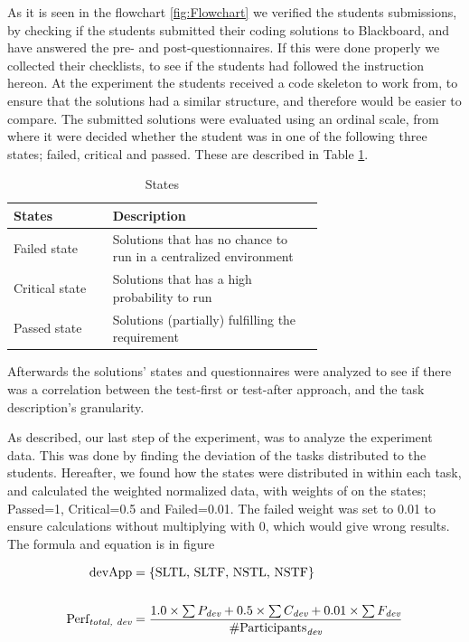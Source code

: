 \documentclass{sig-alternate-05-2015}
\begin{document}
As it is seen in the flowchart \ref{fig:Flowchart} we verified the students submissions, by checking if the students submitted their coding solutions to Blackboard, and have answered the pre- and post-questionnaires. If this were done properly we collected their checklists, to see if the students had followed the instruction hereon.
At the experiment the students received a code skeleton to work from, to ensure that the solutions had a similar structure, and therefore would be easier to compare. The submitted solutions were evaluated using an ordinal scale, from where it were decided whether the student was in one of the following three states; failed, critical and passed. These are described in Table \ref{StatesTable}.

\begin{table}[!ht]
\centering
\caption{States}
\label{StatesTable}
\begin{tabular}{|l|p{0.68\linewidth}|}
\hline
\textbf{States} & \textbf{Description} \\
\hline
\hline
Failed state & Solutions that has no chance to run in a centralized environment \\
Critical state & Solutions that has a high probability to run \\
Passed state & Solutions (partially) fulfilling the requirement \\
\hline
\end{tabular}
\end{table}

Afterwards the solutions' states and questionnaires were analyzed to see if there was a correlation between the test-first or test-after approach, and the task description's granularity.

As described, our last step of the experiment, was to analyze the experiment data. This was done by finding the deviation of the tasks distributed to the students. Hereafter, we found how the states were distributed in within each task, and calculated the weighted normalized data, with weights of on the states; Passed=1, Critical=0.5 and Failed=0.01. The failed weight was set to 0.01 to ensure calculations without multiplying with 0, which would give wrong results.
The formula and equation is in figure

\begin{equation} \label{eq1}
\begin{split}
\text{devApp} &= \{\text{SLTL, SLTF, NSTL, NSTF}\} \\
& \\
\text{Perf}_{\emph{total, dev}} &= \dfrac{1.0\times \sum{P_{\emph{dev}}}+0.5\times \sum {C_{\emph{dev}}}+0.01\times \sum{ F_{\emph{dev}}}}{\# \text{Participants}_{\emph{dev}}}
\end{split}
\end{equation}
\end{document}
